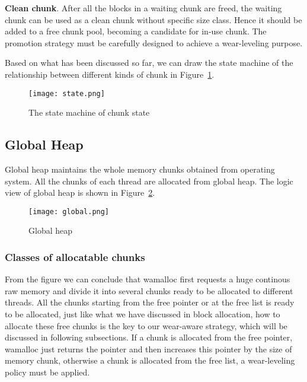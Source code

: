 \documentclass{vldb}
\begin{document}
\textbf{Clean chunk}.
After all the blocks in a waiting chunk are freed, the waiting chunk can be used as a clean chunk without specific size class.
Hence it should be added to a free chunk pool, becoming a candidate for in-use chunk.
The promotion strategy must be carefully designed to achieve a wear-leveling purpose.

Based on what has been discussed so far,
we can draw the state machine of the relationship between different kinds of chunk in Figure~\ref{fig:state}.

\begin{figure}[h]
\centering
\texttt{[image: state.png]}
\caption{The state machine of chunk state}
\label{fig:state}
\end{figure}

\subsection{Global Heap}

Global heap maintains the whole memory chunks obtained from operating system. 
All the chunks of each thread are allocated from global heap. 
The logic view of global heap is shown in Figure~\ref{fig:global}.

\begin{figure}[h]
\centering
\texttt{[image: global.png]}
\caption{Global heap }
\label{fig:global}
\end{figure}

\subsubsection{Classes of allocatable chunks}
From the figure we can conclude that wamalloc first requests a huge continous raw memory and divide it into several chunks ready to be allocated to different threads.
All the chunks starting from the free pointer or at the free list is ready to be allocated, 
just like what we have discussed in block allocation, how to allocate these free chunks is the key to our wear-aware strategy,
which will be discussed in following subsections.
If a chunk is allocated from the free pointer, wamalloc just returns the pointer and then increases this pointer by the size of memory chunk, 
otherwise a chunk is allocated from the free list, a wear-leveling policy must be applied.
\end{document}
